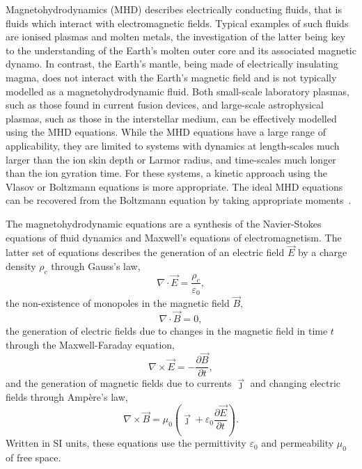Magnetohydrodynamics (MHD) describes electrically conducting fluids, that is fluids which interact with electromagnetic fields. Typical examples of such fluids are ionised plasmas and molten metals, the investigation of the latter being key to the understanding of the Earth's molten outer core and its associated magnetic dynamo. In contrast, the Earth's mantle, being made of electrically insulating magma, does not interact with the Earth's magnetic field and is not typically modelled as a magnetohydrodynamic fluid. Both small-scale laboratory plasmas, such as those found in current fusion devices, and large-scale astrophysical plasmas, such as those in the interstellar medium, can be effectively modelled using the MHD equations. While the MHD equations have a large range of applicability, they are limited to systems with dynamics at length-scales much larger than the ion skin depth or Larmor radius, and time-scales much longer than the ion gyration time. For these systems, a kinetic approach using the Vlasov or Boltzmann equations is more appropriate. The ideal MHD equations can be recovered from the Boltzmann equation by taking appropriate moments~\cite{boydPhysicsPlasmas2003}.

The magnetohydrodynamic equations are a synthesis of the Navier-Stokes equations of fluid dynamics and Maxwell's equations of electromagnetism. The latter set of equations describes the generation of an electric field $\vec{E}$ by a charge density $\rho_c$ through Gauss's law,
\begin{equation}
  \label{eq:gauss_law}
 \nabla \cdot \vec {E} ={\frac {\rho_c }{\varepsilon _{0}}},
\end{equation}
the non-existence of monopoles in the magnetic field $\vec{B}$,
\begin{equation}
  \label{eq:gauss_law_for_magnetism}
  \nabla \cdot \vec {B} =0,
\end{equation}
the generation of electric fields due to changes in the magnetic field in time $t$ through the Maxwell-Faraday equation,
\begin{equation}
  \label{eq:maxwell_faraday}
 \nabla \times \vec {E} =-{\frac {\partial \vec {B} }{\partial t}},
\end{equation}
and the generation of magnetic fields due to currents $\vec{\jmath}$ and changing electric fields through Ampère's law,
\begin{equation}
  \label{eq:ampere_law}
 \nabla \times \vec {B} =\mu _{0}\left(\vec {\jmath} +\varepsilon _{0}{\frac {\partial \vec {E} }{\partial t}}\right).
\end{equation}
Written in SI units, these equations use the permittivity $\varepsilon_{0}$ and permeability $\mu_0$ of free space.

